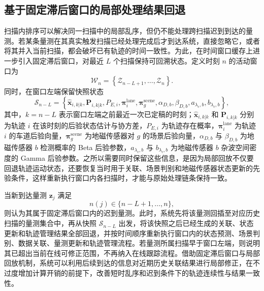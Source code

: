 \documentclass{xdupgthesis}
\begin{document}
\subsection{基于固定滞后窗口的局部处理结果回退}

扫描内排序可以解决同一扫描中的局部乱序，但仍不能处理跨扫描迟到到达的量测。若某条量测在其真实触发扫描已经处理完成后才到达系统，直接忽略它，或者将其并入当前扫描，都会破坏已有轨迹的时间一致性。为此，在时间窗口缓存上进一步引入固定滞后窗口，对最近 $L$ 个扫描保持可回溯状态。定义时刻 $n$ 的活动窗口为
\begin{equation}
	\mathcal W_n=
	\left\{
	\mathcal Z_{n-L+1},\ldots,\mathcal Z_n
	\right\}.
	\label{eq:ch3_lag_window}
\end{equation}
同时，在窗口左端保留快照状态
\begin{equation}
	\mathcal S_{n-L}=
	\left\{
	\hat{\mathbf x}_{i,k|k},\mathbf P_{i,k|k},P_{E,i},
	\boldsymbol\pi_i^{\mathrm{lane}},
	\boldsymbol\pi_g^{\mathrm{scene}},
	\alpha_{D,b},\beta_{D,b},a_{\lambda_c,b},b_{\lambda_c,b}
	\right\},
	\label{eq:ch3_snapshot_reorg}
\end{equation}
其中，$k=n-L$ 表示窗口左端之前最近一次已定稿的时刻；$\hat{\mathbf x}_{i,k|k}$ 和 $\mathbf P_{i,k|k}$ 分别为轨迹 $i$ 在该时刻的后验状态估计与协方差，$P_{E,i}$ 为轨迹存在概率，$\boldsymbol\pi_i^{\mathrm{lane}}$ 为轨迹 $i$ 的车道后验向量，$\boldsymbol\pi_g^{\mathrm{scene}}$ 为地磁传感器对 $g$ 的场景后验向量，$\alpha_{D,b}$ 与 $\beta_{D,b}$ 为地磁传感器 $b$ 检测概率的 Beta 后验参数，$a_{\lambda_c,b}$ 与 $b_{\lambda_c,b}$ 为地磁传感器 $b$ 杂波空间密度的 Gamma 后验参数。之所以需要同时保留这些信息，是因为局部回放不仅要回退轨迹运动状态，还要恢复当时用于关联、场景判别和地磁传感器状态更新的先验条件，这样重新执行窗口内各扫描时，才能与原始处理链条保持一致。

当新到达量测 $\mathbf z_j$ 满足
\begin{equation}
	n(j)\in\{n-L+1,\ldots,n\},
	\label{eq:ch3_late_condition}
\end{equation}
则认为其属于固定滞后窗口内的迟到量测。此时，系统先将该量测回插至对应历史扫描的量测集合中，再从快照 $\mathcal S_{n-L}$ 出发，将该快照之后已经生成的关联、状态更新和轨迹管理结果全部回退，并按时间顺序重新执行窗口内的状态预测、场景判别、数据关联、量测更新和轨迹管理流程。若量测所属扫描早于窗口左端，则说明其已超出当前在线可修正范围，不再纳入在线跟踪流程。借助固定滞后窗口与局部回放机制，系统可以利用后续到达的信息对近期历史关联结果进行局部修正，在不过度增加计算开销的前提下，改善短时乱序和迟到条件下的轨迹连续性与结果一致性。
\end{document}
